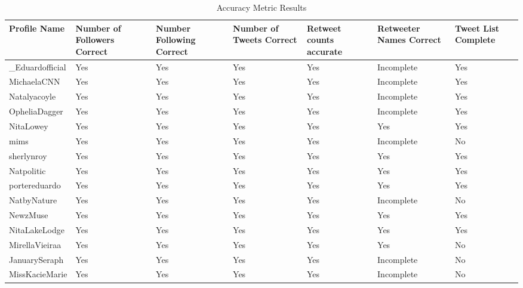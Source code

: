 \begin{table}
\begin{center}
 \begin{tabular}{| p{3cm} | p{3cm}| p{3cm} | p{3cm} | p{3cm} | p{3cm} | p{2cm} |}
 \hline
 \textbf{Profile Name} & \textbf{Number of Followers Correct} & \textbf{Number Following Correct} & \textbf{Number of Tweets Correct} & \textbf{Retweet counts accurate} & \textbf{Retweeter Names Correct} & \textbf{Tweet List Complete}\\ \hline
\_Eduardofficial & Yes & Yes & Yes & Yes & Incomplete & Yes\\ \hline
 MichaelaCNN & Yes & Yes & Yes & Yes & Incomplete & Yes \\ \hline
 Natalyacoyle & Yes & Yes & Yes & Yes & Incomplete & Yes \\ \hline
 OpheliaDagger & Yes & Yes & Yes & Yes & Incomplete & Yes \\ \hline
 NitaLowey & Yes & Yes & Yes & Yes & Yes & Yes  \\ \hline
 mims & Yes & Yes & Yes & Yes & Incomplete & No \\ \hline
 sherlynroy & Yes & Yes & Yes & Yes & Yes & Yes \\ \hline
 Natpolitic & Yes & Yes & Yes & Yes & Yes & Yes \\ \hline
 portereduardo & Yes & Yes & Yes & Yes & Yes & Yes \\ \hline
 NatbyNature & Yes & Yes & Yes & Yes & Incomplete & No \\ \hline
 NewzMuse & Yes & Yes & Yes & Yes & Yes & Yes \\ \hline
 NitaLakeLodge & Yes & Yes & Yes & Yes & Yes & Yes \\ \hline
 MirellaVieiraa & Yes & Yes & Yes & Yes & Yes & No \\ \hline
 JanuarySeraph & Yes & Yes & Yes & Yes & Incomplete & No \\ \hline
 MissKacieMarie & Yes & Yes & Yes & Yes & Incomplete & No \\ \hline
 \end{tabular}
\end{center}
\caption{Accuracy Metric Results}
\label{tab:accuracy_result}
\end{table}

